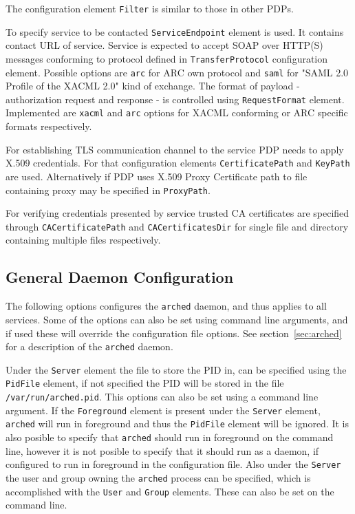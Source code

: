 \documentclass{article}
\begin{document}
The configuration element \texttt{Filter} is similar to those in other PDPs.

To specify service to be contacted \texttt{ServiceEndpoint} element is used. It contains
contact URL of service. Service is expected to accept SOAP over HTTP(S) messages conforming
to protocol defined in \texttt{TransferProtocol} configuration element. Possible options
are \texttt{arc} for ARC own protocol and \texttt{saml} for "SAML 2.0 Profile of the XACML 2.0"
kind of exchange. The format of payload - authorization request and response - is controlled
using \texttt{RequestFormat} element. Implemented are \texttt{xacml} and \texttt{arc} options
for XACML conforming or ARC specific formats respectively.

For establishing TLS communication channel to the service PDP needs to apply X.509 credentials.
For that configuration elements \texttt{CertificatePath} and \texttt{KeyPath} are used.
Alternatively if PDP uses X.509 Proxy Certificate path to file containing proxy may be
specified in \texttt{ProxyPath}.

For verifying credentials presented by service trusted CA certificates are specified through
\texttt{CACertificatePath} and \texttt{CACertificatesDir} for single file and directory
containing multiple files respectively.

\subsection{General Daemon Configuration}\label{sec:General Daemon Configuration}
The following options configures the \texttt{arched} daemon, and thus applies to
all services. Some of the options can also be set using command line arguments,
and if used these will override the configuration file options. See
section~\ref{sec:arched} for a description of the \texttt{arched} daemon.

Under the \texttt{Server} element the file to store the PID in, can be specified
using the \texttt{PidFile} element, if not specified the PID will be stored in
the file \texttt{/var/run/arched.pid}. This options can also be set using a
command line argument. If the \texttt{Foreground} element is
present under the \texttt{Server} element, \texttt{arched} will run in
foreground and thus the \texttt{PidFile} element will be ignored. It is also
posible to specify that \texttt{arched} should run in foreground on the command
line, however it is not posible to specify that it should run as a daemon, if
configured to run in foreground in the configuration file. Also under the
\texttt{Server} the user and group owning the \texttt{arched} process can be
specified, which is accomplished with the \texttt{User} and \texttt{Group}
elements. These can also be set on the command line.
\end{document}
